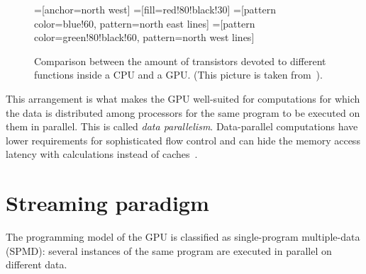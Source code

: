 \begin{figure}
  \centering
  =[anchor=north west]
  =[fill=red!80!black!30]
  =[pattern color=blue!60, pattern=north east lines]
  =[pattern color=green!80!black!60, pattern=north west lines]
  \label{fig:transistors}
  \caption[Comparison between CPU and GPU layout]{
    Comparison between the amount of transistors
    devoted to different functions inside a CPU and a GPU.
    (This picture is taken from~\cite[\S1]{cudaprog2}).
  }
\end{figure}

This arrangement is what makes the GPU
well-suited for computations
for which the data is distributed among processors
for the same program to be executed on them in parallel.
This is called \emph{data parallelism}.
Data-parallel computations have lower requirements
for sophisticated flow control
and can hide the memory access latency with calculations
instead of caches~\cite[\S1.2]{cudaprog2}.




\section{Streaming paradigm}

The programming model of the GPU is classified as single-program multiple-data (SPMD):
several instances of the same program are executed in parallel
on different data.

